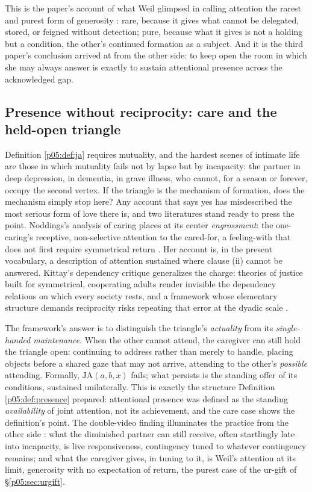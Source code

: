 This is the paper's account of what Weil glimpsed in calling attention the rarest and purest form of generosity \parencite{weil1951}: rare, because it gives what cannot be delegated, stored, or feigned without detection; pure, because what it gives is not a holding but a condition, the other's continued formation as a subject. And it is the third paper's conclusion arrived at from the other side: to keep open the room in which she may always answer is exactly to sustain attentional presence across the acknowledged gap.

\subsection{Presence without reciprocity: care and the held-open triangle}
\label{p05:sec:care}

Definition \ref{p05:def:ja} requires mutuality, and the hardest scenes of intimate life are those in which mutuality fails not by lapse but by incapacity: the partner in deep depression, in dementia, in grave illness, who cannot, for a season or forever, occupy the second vertex. If the triangle is the mechanism of formation, does the mechanism simply stop here? Any account that says yes has misdescribed the most serious form of love there is, and two literatures stand ready to press the point. Noddings's analysis of caring places at its center \emph{engrossment}: the one-caring's receptive, non-selective attention to the cared-for, a feeling-with that does not first require symmetrical return \parencite{noddings1984}. Her account is, in the present vocabulary, a description of attention sustained where clause (ii) cannot be answered. Kittay's dependency critique generalizes the charge: theories of justice built for symmetrical, cooperating adults render invisible the dependency relations on which every society rests, and a framework whose elementary structure demands reciprocity risks repeating that error at the dyadic scale \parencite{kittay1999}.

The framework's answer is to distinguish the triangle's \emph{actuality} from its \emph{single-handed maintenance}. When the other cannot attend, the caregiver can still hold the triangle open: continuing to address rather than merely to handle, placing objects before a shared gaze that may not arrive, attending to the other's \emph{possible} attending. Formally, $\mathrm{JA}(a,b,x)$ fails; what persists is the standing offer of its conditions, sustained unilaterally. This is exactly the structure Definition \ref{p05:def:presence} prepared: attentional presence was defined as the standing \emph{availability} of joint attention, not its achievement, and the care case shows the definition's point. The double-video finding illuminates the practice from the other side \parencite{murray1985}: what the diminished partner can still receive, often startlingly late into incapacity, is live responsiveness, contingency tuned to whatever contingency remains; and what the caregiver gives, in tuning to it, is Weil's attention at its limit, generosity with no expectation of return, the purest case of the ur-gift of §\ref{p05:sec:urgift}.

